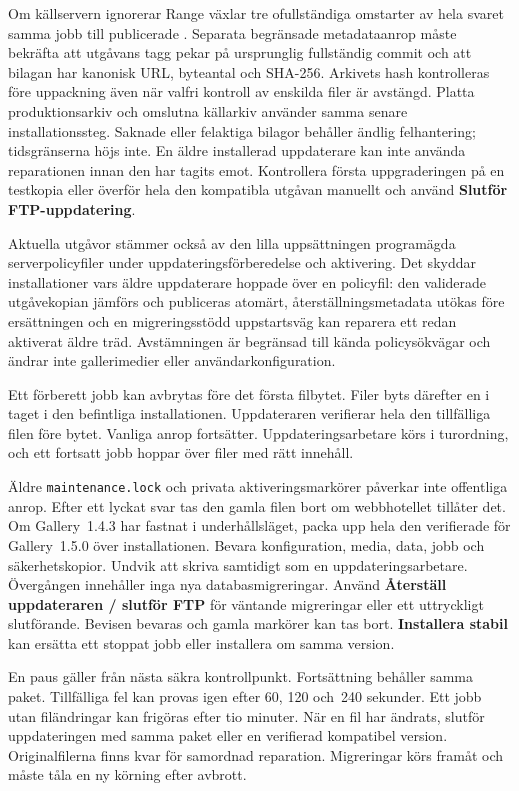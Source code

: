 \documentclass[11pt,a4paper]{article}
\newcommand{\filepath}[1]{\path{#1}}
\newcommand{\ui}[1]{\textbf{#1}}
\newcommand{\codeword}[1]{\nolinkurl{#1}}
\begin{document}
Om källservern ignorerar Range växlar tre ofullständiga omstarter av hela
svaret samma jobb till publicerade \filepath{production.zip}.
Separata begränsade metadataanrop måste bekräfta att utgåvans tagg pekar på
ursprunglig fullständig commit och att bilagan har kanonisk URL, byteantal
och SHA-256. Arkivets hash kontrolleras före uppackning även när valfri
kontroll av enskilda filer är avstängd. Platta produktionsarkiv och omslutna
källarkiv använder samma senare installationssteg. Saknade eller felaktiga
bilagor behåller ändlig felhantering; tidsgränserna höjs inte.
En äldre installerad uppdaterare kan inte använda reparationen innan den
har tagits emot. Kontrollera första uppgraderingen på en testkopia eller
överför hela den kompatibla utgåvan manuellt och använd
\ui{Slutför FTP-uppdatering}.

Aktuella utgåvor stämmer också av den lilla uppsättningen programägda
serverpolicyfiler under uppdateringsförberedelse och aktivering. Det skyddar
installationer vars äldre uppdaterare hoppade över en policyfil: den validerade
utgåvekopian jämförs och publiceras atomärt, återställningsmetadata utökas före
ersättningen och en migreringsstödd uppstartsväg kan reparera ett redan
aktiverat äldre träd. Avstämningen är begränsad till kända policysökvägar och
ändrar inte gallerimedier eller användarkonfiguration.

Ett förberett jobb kan avbrytas före det första filbytet. Filer byts därefter
en i taget i den befintliga installationen. Uppdateraren verifierar hela den
tillfälliga filen före bytet. Vanliga anrop fortsätter. Uppdateringsarbetare
körs i turordning, och ett fortsatt jobb hoppar över filer med rätt innehåll.

Äldre \codeword{maintenance.lock} och privata aktiveringsmarkörer påverkar
inte offentliga anrop. Efter ett lyckat svar tas den gamla filen bort om
webbhotellet tillåter det. Om Gallery~1.4.3 har fastnat i underhållsläget, packa upp
hela den verifierade \filepath{production.zip} för Gallery~1.5.0 över
installationen. Bevara konfiguration, media, data, jobb och säkerhetskopior.
Undvik att skriva samtidigt som en uppdateringsarbetare. Övergången innehåller
inga nya databasmigreringar. Använd \ui{Återställ uppdateraren / slutför FTP}
för väntande migreringar eller ett uttryckligt slutförande. Bevisen bevaras
och gamla markörer kan tas bort. \ui{Installera stabil} kan ersätta ett
stoppat jobb eller installera om samma version.

En paus gäller från nästa säkra kontrollpunkt. Fortsättning behåller samma
paket. Tillfälliga fel kan provas igen efter 60, 120 och~240 sekunder. Ett jobb
utan filändringar kan frigöras efter tio minuter. När en fil har ändrats,
slutför uppdateringen med samma paket eller en verifierad kompatibel version.
Originalfilerna finns kvar för samordnad reparation. Migreringar körs framåt
och måste tåla en ny körning efter avbrott.
\end{document}
